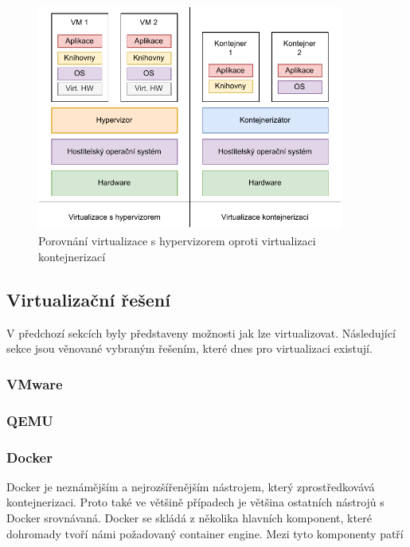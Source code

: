\begin{figure}[htbp]
    \centering 
    \includegraphics[width=0.9\textwidth]{assets/img/containerization.pdf}
    \caption{Porovnání virtualizace s hypervizorem oproti virtualizaci kontejnerizací}
    \label{fig:containerization}
\end{figure}


\subsection{Virtualizační řešení}

V předchozí sekcích byly představeny možnosti jak lze virtualizovat. Následující sekce jsou věnované vybraným řešením, které dnes pro virtualizaci existují.


\subsubsection{VMware}

\subsubsection{QEMU}

\subsubsection{Docker} 
Docker je neznámějším a nejrozšířenějším nástrojem, který zprostředkovává kontejnerizaci. Proto také ve většině případech je většina ostatních nástrojů s Docker srovnávaná. Docker se skládá z několika hlavních komponent, které dohromady tvoří námi požadovaný container engine. Mezi tyto komponenty patří

